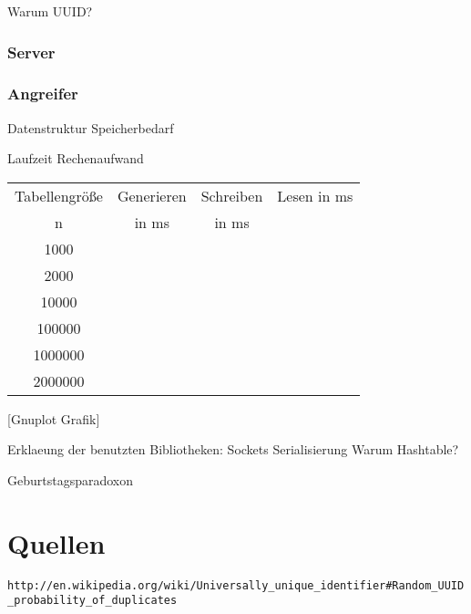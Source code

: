 \documentclass[a4paper,12pt]{article}
\begin{document}
Warum UUID?

\subsubsection{Server}

\subsubsection{Angreifer}

Datenstruktur
Speicherbedarf

Laufzeit Rechenaufwand

\begin{tabular} [h] {||c|c|c|c||} 
\hline \rule[-1.5mm]{0pt}{5.5ex} Tabellengröße & Generieren  & Schreiben & Lesen in ms\\ 
\rule[-1.5mm]{0pt}{5.5ex} n & in ms  & in ms & \\ 
\hline
\hline \rule[-1.5mm]{0pt}{5.5ex} 1000 &  & & \\ 
\hline \rule[-1.5mm]{0pt}{5.5ex} 2000 &  & & \\ 
\hline \rule[-1.5mm]{0pt}{5.5ex} 10000 &  & & \\ 
\hline \rule[-1.5mm]{0pt}{5.5ex} 100000 &  & & \\ 
\hline \rule[-1.5mm]{0pt}{5.5ex} 1000000 &  & & \\ 
\hline \rule[-1.5mm]{0pt}{5.5ex} 2000000 &  & & \\ 
\hline
\end{tabular}

[Gnuplot Grafik]

Erklaeung der benutzten Bibliotheken:
Sockets
Serialisierung
Warum Hashtable?

Geburtstagsparadoxon

\section{Quellen}

\nolinkurl{http://en.wikipedia.org/wiki/Universally_unique_identifier#Random_UUID_probability_of_duplicates}
\end{document}
